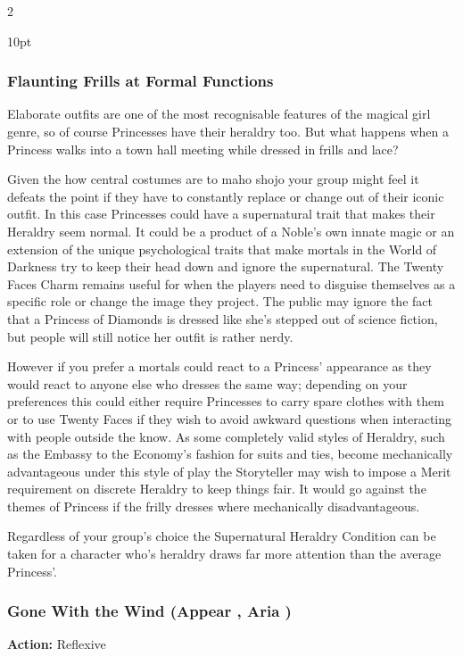 \begin{multicols}{2}
\begin{myindentpar}{10pt}
\end{myindentpar}

\bigsidebarstart


 
\subsubsection*{Flaunting Frills at Formal Functions}
 
 Elaborate outfits are one of the most recognisable features of the magical girl genre, so of course Princesses have their heraldry too. But what happens when a Princess walks into a town hall meeting while dressed in frills and lace? 
  
 Given the how central costumes are to maho shojo your group might feel it defeats the point if they have to constantly replace or change out of their iconic outfit. In this case Princesses could have a supernatural trait that makes their Heraldry seem normal. It could be a product of a Noble's own innate magic or an extension of the unique psychological traits that make mortals in the World of Darkness try to keep their head down and ignore the supernatural. The Twenty Faces Charm remains useful for when the players need to disguise themselves as a specific role or change the image they project. The public may ignore the fact that a Princess of Diamonds is dressed like she's stepped out of science fiction, but people will still notice her outfit is rather nerdy. 
  
 However if you prefer a mortals could react to a Princess' appearance as they would react to anyone else who dresses the same way; depending on your preferences this could either require Princesses to carry spare clothes with them or to use Twenty Faces if they wish to avoid awkward questions when interacting with people outside the know. As some completely valid styles of Heraldry, such as the Embassy to the Economy's fashion for suits and ties, become mechanically advantageous under this style of play the Storyteller may wish to impose a Merit requirement on discrete Heraldry to keep things fair. It would go against the themes of Princess if the frilly dresses where mechanically disadvantageous. 
  
 Regardless of your group's choice the Supernatural Heraldry Condition can be taken for a character who's heraldry draws far more attention than the average Princess'.
 
\bigsidebarend

\subsubsection*{Gone With the Wind (Appear \textbullet, Aria \textbullet )}
\noindent \textbf{Action:} Reflexive


\end{multicols}
